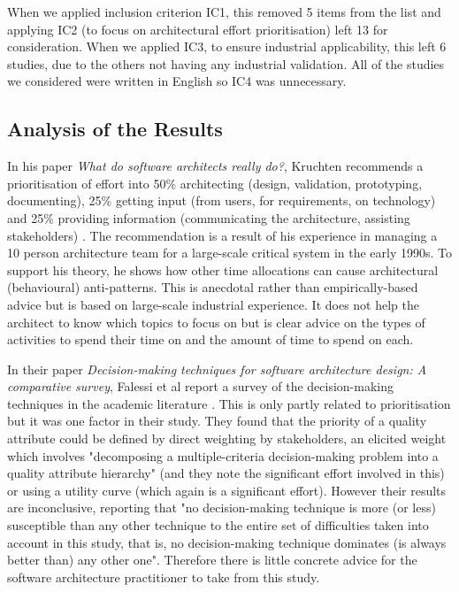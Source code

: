 When we applied inclusion criterion IC1, this removed 5 items from the list and applying IC2 (to focus on architectural effort prioritisation) left 13 for consideration.  When we applied IC3, to ensure industrial applicability, this left 6 studies, due to the others not having any industrial validation.  All of the studies we considered were written in English so IC4 was unnecessary.

\subsection{Analysis of the Results}

In his paper \emph{What do software architects really do?}, Kruchten recommends a prioritisation of effort into 50\% architecting (design, validation, prototyping, documenting), 25\% getting input (from users, for requirements, on technology) and 25\% providing information (communicating the architecture, assisting stakeholders) \cite{kruchten2008-architectsdo}. The recommendation is a result of his experience in managing a 10 person architecture team for a large-scale critical system in the early 1990s.  To support his theory, he shows how other time allocations can cause architectural (behavioural) anti-patterns.  This is anecdotal rather than empirically-based advice but is based on large-scale industrial experience.  It does not help the architect to know which topics to focus on but is clear advice on the types of activities to spend their time on and the amount of time to spend on each.

In their paper \emph{Decision-making techniques for software architecture design: A comparative survey}, Falessi et al report a survey of the decision-making techniques in the academic literature \cite{falessi2011-archdecisionsurvey}.  This is only partly related to prioritisation but it was one factor in their study.  They found that the priority of a quality attribute could be defined by direct weighting by stakeholders, an elicited weight which involves "decomposing a multiple-criteria decision-making problem into a quality attribute hierarchy" (and they note the significant effort involved in this) or using a utility curve (which again is a significant effort).  However their results are inconclusive, reporting that "no decision-making technique is more (or less) susceptible than any other technique to the entire set of difficulties taken into account in this study, that is, no decision-making technique dominates (is always better than) any other one".  Therefore there is little concrete advice for the software architecture practitioner to take from this study.

